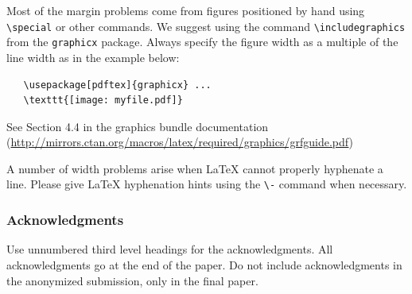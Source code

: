 \documentclass{article}
\begin{document}
Most of the margin problems come from figures positioned by hand using
\verb+\special+ or other commands. We suggest using the command
\verb+\includegraphics+ from the \verb+graphicx+ package. Always
specify the figure width as a multiple of the line width as in the
example below:
\begin{verbatim}
   \usepackage[pdftex]{graphicx} ...
   \texttt{[image: myfile.pdf]}
\end{verbatim}
See Section 4.4 in the graphics bundle documentation
(\url{http://mirrors.ctan.org/macros/latex/required/graphics/grfguide.pdf})

A number of width problems arise when \LaTeX{} cannot properly
hyphenate a line. Please give LaTeX hyphenation hints using the
\verb+\-+ command when necessary.

\subsubsection*{Acknowledgments}

Use unnumbered third level headings for the acknowledgments. All
acknowledgments go at the end of the paper. Do not include
acknowledgments in the anonymized submission, only in the final paper.


\small
\medskip









\end{document}
